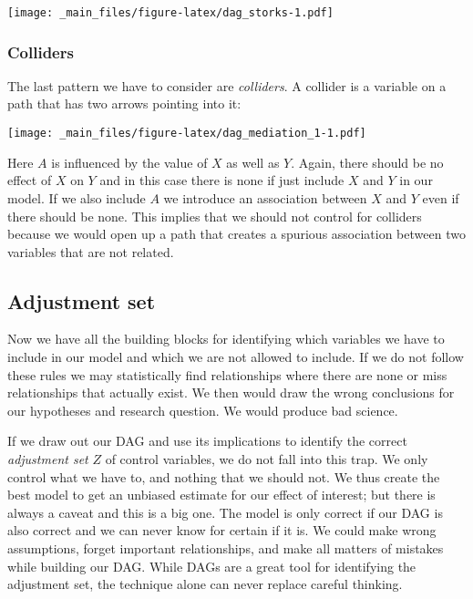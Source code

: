 \documentclass[
]{book}
\begin{document}
\texttt{[image: \_main\_files/figure-latex/dag\_storks-1.pdf]}

\hypertarget{colliders}{%
\subsubsection{Colliders}\label{colliders}}

The last pattern we have to consider are \emph{colliders}. A collider is a variable
on a path that has two arrows pointing into it:

\texttt{[image: \_main\_files/figure-latex/dag\_mediation\_1-1.pdf]}

Here \(A\) is influenced by the value of \(X\) as well as \(Y\). Again, there should
be no effect of \(X\) on \(Y\) and in this case there is none if just include \(X\)
and \(Y\) in our model. If we also include \(A\) we introduce an association
between \(X\) and \(Y\) even if there should be none. This implies that we should
not control for colliders because we would open up a path that creates a spurious
association between two variables that are not related.

\hypertarget{adjustment-set}{%
\subsection{Adjustment set}\label{adjustment-set}}

Now we have all the building blocks for identifying which variables we have to
include in our model and which we are not allowed to include. If we do not follow
these rules we may statistically find relationships where there are none or miss
relationships that actually exist. We then would draw the wrong conclusions for
our hypotheses and research question. We would produce bad science.

If we draw out our DAG and use its implications to identify the correct
\emph{adjustment set} \(Z\) of control variables, we do not fall into this trap.
We only control what we have to, and nothing that we should not. We thus create
the best model to get an unbiased estimate for our effect of interest;
but there is always a caveat and this is a big one. The model is only correct if
our DAG is also correct and we can never know for certain if it is. We could
make wrong assumptions, forget important relationships, and make all matters of
mistakes while building our DAG. While DAGs are a great tool for identifying the
adjustment set, the technique alone can never replace careful thinking.
\end{document}
